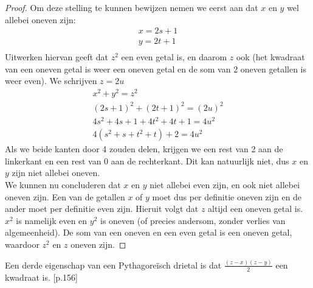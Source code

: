 \documentclass[12pt,reqno]{article}
\theoremstyle{theorem}
\theoremstyle{definition}
\begin{document}
	\begin{proof}
		Om deze stelling te kunnen bewijzen nemen we eerst aan dat $x$ en $y$ wel allebei oneven zijn:
		\begin{align*}
			x = 2s + 1\\
			y = 2t + 1\\
		\end{align*}
		Uitwerken hiervan geeft dat $z^2$ een even getal is, en daarom $z$ ook (het kwadraat van een oneven getal is weer een oneven getal en de som van 2 oneven getallen is weer even). We schrijven $z = 2u$
		\begin{align*}
			x^2 + y^2 = z^2\\
			(2s + 1)^2 + (2t + 1)^2 = (2u)^2\\
			4s^2 + 4s + 1 +4t^2 + 4t + 1 = 4u^2\\
			4(s^2 + s + t^2 + t) + 2 = 4u^2
		\end{align*}
		Als we beide kanten door 4 zouden delen, krijgen we een rest van 2 aan de linkerkant en een rest van 0 aan de rechterkant. Dit kan natuurlijk niet, dus $x$ en $y$ zijn niet allebei oneven. \\
		We kunnen nu concluderen dat $x$ en $y$ niet allebei even zijn, en ook niet allebei oneven zijn. Een van de getallen $x$ of $y$ moet dus per definitie oneven zijn en de ander moet per definitie even zijn. Hieruit volgt dat $z$ altijd een oneven getal is. $x^2$ is namelijk even en $y^2$ is oneven (of precies andersom, zonder verlies van algemeenheid). De som van een oneven en een even getal is een oneven getal, waardoor $z^2$ en $z$ oneven zijn.
	\end{proof}
	Een derde eigenschap van een Pythagore\"isch drietal is dat $\frac{(z-x)(z-y)}{2}$ een kwadraat is. \cite{Posamentier}[p.156]
	
\end{document}
